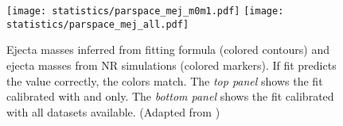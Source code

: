 \begin{figure}[t!]
    \centering 
    \texttt{[image: statistics/parspace\_mej\_m0m1.pdf]}
    \texttt{[image: statistics/parspace\_mej\_all.pdf]}
    \caption{
        Ejecta masses inferred from \polql{} fitting formula (colored 
        contours) and ejecta masses from \ac{NR} simulations (colored markers).
        If fit predicts the value correctly, the colors match. 
        The \emph{top panel} shows the fit calibrated with 
        \DSrefset{} and \DSheatcool{} only. The \emph{bottom panel} shows 
        the fit calibrated with all datasets available. 
        (Adapted from \citet{Nedora:2020qtd})
    }
    \label{fig:mej_parspace}
\end{figure}

